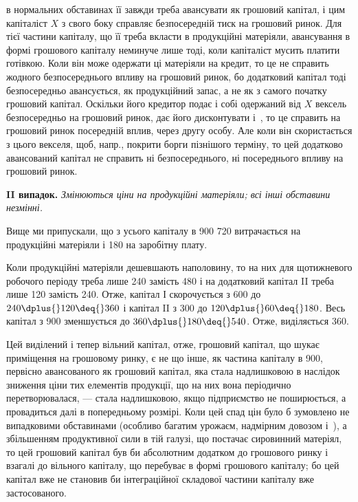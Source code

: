 \parcont{}  %
в нормальних обставинах її завжди треба авансувати як грошовий капітал,
і цим капіталіст $X$ з свого боку справляє безпосередній тиск на грошовий
ринок. Для тієї частини капіталу, що її треба вкласти в продукційні
матеріяли, авансування в формі грошового капіталу неминуче лише
тоді, коли капіталіст мусить платити готівкою. Коли він може одержати
ці матеріяли на кредит, то це не справить жодного безпосереднього
впливу на грошовий ринок, бо додатковий капітал тоді безпосередньо
авансується, як продукційний запас, а не як з самого початку грошовий
капітал. Оскільки його кредитор подає і собі одержаний від $X$ вексель
безпосередньо на грошовий ринок, дає його дисконтувати і~, то це
справить на грошовий ринок посередній вплив, через другу особу. Але
коли він скористається з цього векселя, щоб, напр., покрити борги пізнішого
терміну, то цей додатково авансований капітал не справить ні
безпосереднього, ні посереднього впливу на грошовий ринок.

\textbf{II випадок.} \emph{Змінюються ціни на продукційні матеріяли; всі інші
обставини незмінні.}

Вище ми припускали, що з усього капіталу в 900  \deq{} 720 витрачається на продукційні матеріяли і  \deq{} 180 на заробітну
плату.

Коли продукційні матеріяли дешевшають наполовину, то на них для
щотижневого робочого періоду треба лише 240 замість 480 і на додатковий капітал II треба лише 120 замість
240. Отже, капітал І скорочується з 600 до $240 \dplus{}
120 \deq{} 360$ і капітал II з 300 до $120 \dplus{} 60 \deq{} 180$. Весь капітал з 900 зменшується до $360 \dplus{} 180 \deq{} 540$. Отже, виділяється 360.

Цей виділений і тепер вільний капітал, отже, грошовий капітал, що
шукає приміщення на грошовому ринку, є не що інше, як частина капіталу
в 900, первісно авансованого як грошовий капітал, яка
стала надлишковою в наслідок зниження ціни тих елементів продукції,
що на них вона періодично перетворювалася, — стала надлишковою,
якщо підприємство не поширюється, а провадиться далі в попередньому
розмірі. Коли цей спад цін було б зумовлено не випадковими обставинами
(особливо багатим урожаєм, надмірним довозом і~), а збільшенням
продуктивної сили в тій галузі, що постачає сировинний матеріял,
то цей грошовий капітал був би абсолютним додатком до грошового
ринку і взагалі до вільного капіталу, що перебуває в формі грошового
капіталу; бо цей капітал вже не становив би інтеграційної складової частини
капіталу вже застосованого.

